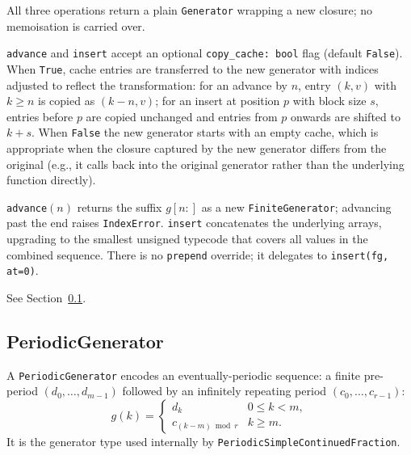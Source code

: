 \begin{description}[leftmargin=2em, style=nextline]
  \item[\texttt{Generator}]
    All three operations return a plain \texttt{Generator} wrapping a
    new closure; no memoisation is carried over.

  \item[\texttt{CachedGenerator}]
    \texttt{advance} and \texttt{insert} accept an optional
    \texttt{copy\_cache: bool} flag (default \texttt{False}).
    When \texttt{True}, cache entries are transferred to the new generator
    with indices adjusted to reflect the transformation: for an advance by
    $n$, entry $(k, v)$ with $k \geq n$ is copied as $(k - n, v)$; for an
    insert at position $p$ with block size $s$, entries before $p$ are
    copied unchanged and entries from $p$ onwards are shifted to $k + s$.
    When \texttt{False} the new generator starts with an empty cache,
    which is appropriate when the closure captured by the new generator
    differs from the original (e.g., it calls back into the original generator
    rather than the underlying function directly).

  \item[\texttt{FiniteGenerator}]
    \texttt{advance}$(n)$ returns the suffix $g[n:]$ as a new
    \texttt{FiniteGenerator}; advancing past the end raises
    \texttt{IndexError}.  \texttt{insert} concatenates the underlying
    arrays, upgrading to the smallest unsigned typecode that covers all
    values in the combined sequence.  There is no \texttt{prepend} override;
    it delegates to \texttt{insert(fg, at=0)}.

  \item[\texttt{PeriodicGenerator}]
    See Section~\ref{subsec:periodic-gen}.
\end{description}

\subsection{PeriodicGenerator}
\label{subsec:periodic-gen}

A \texttt{PeriodicGenerator} encodes an eventually-periodic sequence: a
finite pre-period $(d_0, \ldots, d_{m-1})$ followed by an infinitely
repeating period $(c_0, \ldots, c_{r-1})$:
\[
  g(k) =
  \begin{cases}
    d_k & 0 \leq k < m, \\
    c_{(k - m) \bmod r} & k \geq m.
  \end{cases}
\]
It is the generator type used internally by
\texttt{PeriodicSimpleContinuedFraction}.

